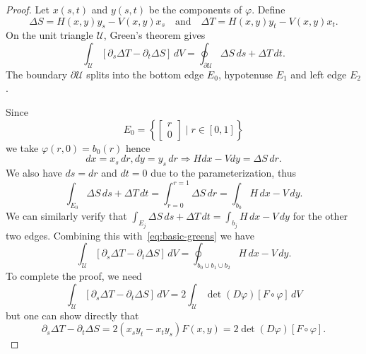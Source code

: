 \documentclass[oneside, reqno]{amsart}
\theoremstyle{definition}
\newcommand{\utri}{\mathcal{U}}
\begin{document}
\begin{proof}
Let \(x(s, t)\) and \(y(s, t)\) be the components of \(\varphi\). Define
\begin{equation}
\Delta S = H(x, y) y_s - V(x, y) x_s \quad \text{and} \quad
\Delta T = H(x, y) y_t - V(x, y) x_t.
\end{equation}
On the unit triangle \(\utri\), Green's theorem gives
\begin{equation}\label{eq:basic-greens}
\int_{\mathcal{U}} \left[\partial_s \Delta T -
  \partial_t \Delta S\right] \, dV =
\oint_{\partial \mathcal{U}} \Delta S \, ds + \Delta T \, dt.
\end{equation}
The boundary \(\partial \utri\) splits into the bottom edge \(E_0\),
hypotenuse \(E_1\) and left edge \(E_2\).

Since
\begin{equation}
E_0 = \left\{ \left[ \begin{array}{c} r \\ 0 \end{array}\right] \mid
  r \in \left[0, 1\right] \right\}
\end{equation}
we take \(\varphi(r, 0) = b_0(r)\) hence
\begin{equation}
dx = x_s \, dr, dy = y_s \, dr \Longrightarrow
H dx - V dy = \Delta S \, dr.
\end{equation}
We also have \(ds = dr\) and \(dt = 0\) due to the
parameterization, thus
\begin{equation}
\int_{E_0} \Delta S \, ds + \Delta T \, dt =
  \int_{r = 0}^{r = 1} \Delta S \, dr = \int_{b_0} H \, dx - V \, dy.
\end{equation}
We can similarly verify that
\(\int_{E_j} \Delta S \, ds + \Delta T \, dt = \int_{b_j} H \, dx - V \, dy\)
for the other two edges. Combining this with~\eqref{eq:basic-greens}
we have
\begin{equation}
\int_{\mathcal{U}} \left[\partial_s \Delta T -
  \partial_t \Delta S\right] \, dV =
\oint_{b_0 \cup b_1 \cup b_2} H \, dx - V \, dy.
\end{equation}
To complete the proof, we need
\begin{equation}
\int_{\mathcal{U}} \left[\partial_s \Delta T -
  \partial_t \Delta S\right] \, dV =
2 \int_{\mathcal{U}} \det(D\varphi) \left[F \circ \varphi\right] \, dV
\end{equation}
but one can show directly that
\begin{equation}
\partial_s \Delta T - \partial_t \Delta S =
  2 \left(x_s y_t - x_t y_s\right) F(x, y) =
  2 \det(D\varphi) \left[F \circ \varphi\right]. \tag*{\qedhere}
\end{equation}
\end{proof}
\end{document}
